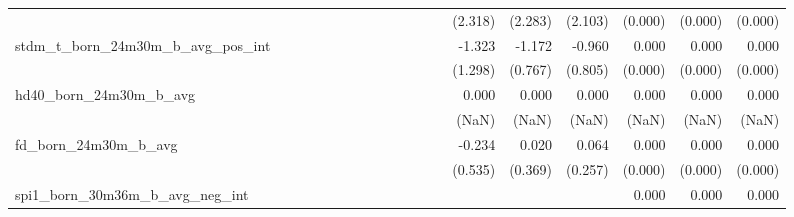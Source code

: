 \begin{tabular}{lrrrrrrrrrrrrrrrrrr}
                                            &              &              &              &              &              &              &              &              &               &              &              &               &      (2.318) &      (2.283) &       (2.103) &      (0.000) &      (0.000) &       (0.000) \\ 
stdm\_t\_born\_24m30m\_b\_avg\_pos\_int     &              &              &              &              &              &              &              &              &               &              &              &               &       -1.323 &       -1.172 &        -0.960 &        0.000 &        0.000 &         0.000 \\ 
                                            &              &              &              &              &              &              &              &              &               &              &              &               &      (1.298) &      (0.767) &       (0.805) &      (0.000) &      (0.000) &       (0.000) \\ 
hd40\_born\_24m30m\_b\_avg                  &              &              &              &              &              &              &              &              &               &              &              &               &        0.000 &        0.000 &         0.000 &        0.000 &        0.000 &         0.000 \\ 
                                            &              &              &              &              &              &              &              &              &               &              &              &               &        (NaN) &        (NaN) &         (NaN) &        (NaN) &        (NaN) &         (NaN) \\ 
fd\_born\_24m30m\_b\_avg                    &              &              &              &              &              &              &              &              &               &              &              &               &       -0.234 &        0.020 &         0.064 &        0.000 &        0.000 &         0.000 \\ 
                                            &              &              &              &              &              &              &              &              &               &              &              &               &      (0.535) &      (0.369) &       (0.257) &      (0.000) &      (0.000) &       (0.000) \\ 
spi1\_born\_30m36m\_b\_avg\_neg\_int        &              &              &              &              &              &              &              &              &               &              &              &               &              &              &               &        0.000 &        0.000 &         0.000 \\ 

\end{tabular}
